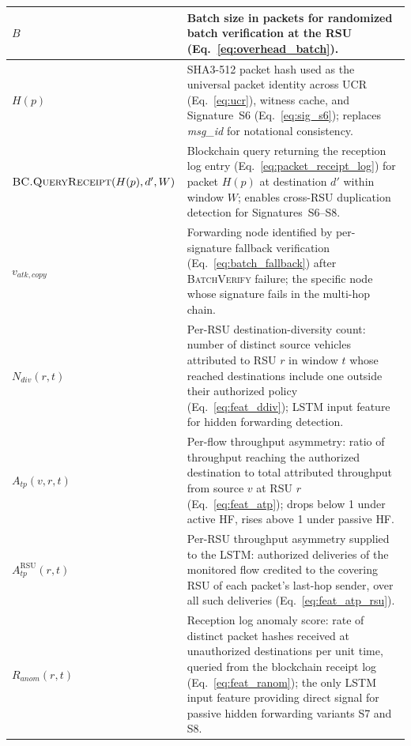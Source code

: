 \documentclass[12pt, a4paper]{report}
\begin{document}
\begin{longtable}{|m{5.0cm}|m{9.0cm}|}
\hline
$B$ & Batch size in packets for randomized batch verification at the \ac{RSU} (Eq.~\ref{eq:overhead_batch}). \\
\hline
$H(p)$ & SHA3-512 packet hash used as the universal packet identity across \ac{UCR} (Eq.~\ref{eq:ucr}), witness cache, and Signature~S6 (Eq.~\ref{eq:sig_s6}); replaces \textit{msg\_id} for notational consistency. \\
\hline
$\textsc{BC.QueryReceipt}(H(p),d',W)$ & Blockchain query returning the reception log entry (Eq.~\ref{eq:packet_receipt_log}) for packet $H(p)$ at destination $d'$ within window $W$; enables cross-\ac{RSU} duplication detection for Signatures~S6--S8. \\
\hline
$v_{atk,copy}$ & Forwarding node identified by per-signature fallback verification (Eq.~\ref{eq:batch_fallback}) after \textsc{BatchVerify} failure; the specific node whose signature fails in the multi-hop chain. \\
\hline
$N_{div}(r,t)$ & Per-\ac{RSU} destination-diversity count: number of distinct source vehicles attributed to \ac{RSU} $r$ in window $t$ whose reached destinations include one outside their authorized policy (Eq.~\ref{eq:feat_ddiv}); \ac{LSTM} input feature for hidden forwarding detection. \\
\hline
$A_{tp}(v,r,t)$ & Per-flow throughput asymmetry: ratio of throughput reaching the authorized destination to total attributed throughput from source $v$ at \ac{RSU} $r$ (Eq.~\ref{eq:feat_atp}); drops below 1 under active \ac{HF}, rises above 1 under passive \ac{HF}. \\
\hline
$A_{tp}^{\mathrm{RSU}}(r,t)$ & Per-\ac{RSU} throughput asymmetry supplied to the \ac{LSTM}: authorized deliveries of the monitored flow credited to the covering \ac{RSU} of each packet's last-hop sender, over all such deliveries (Eq.~\ref{eq:feat_atp_rsu}). \\
\hline
$R_{anom}(r,t)$ &
Reception log anomaly score: rate of distinct packet
hashes received at unauthorized destinations per
unit time, queried from the blockchain receipt log
(Eq.~\ref{eq:feat_ranom}); the only \ac{LSTM} input
feature providing direct signal for passive hidden
forwarding variants S7 and S8. \\



\end{longtable}
\end{document}
